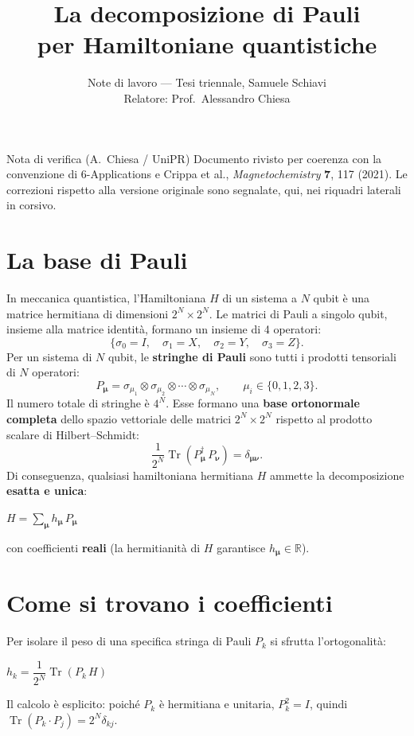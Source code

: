 \documentclass[11pt,a4paper]{article}
\title{\vspace{-1.5em}\color{inkblue}La decomposizione di Pauli\\[0.1em]per Hamiltoniane quantistiche}
\author{Note di lavoro --- Tesi triennale, Samuele Schiavi\\ Relatore: Prof.\ Alessandro Chiesa}
\date{}
\begin{document}
\sloppy
\maketitle
\thispagestyle{fancy}
\vspace{-2em}

\begin{advisorbox}{Nota di verifica (A.\ Chiesa / UniPR)}
Documento rivisto per coerenza con la convenzione di 6-Applications e
Crippa et al., \emph{Magnetochemistry} \textbf{7}, 117 (2021). Le
correzioni rispetto alla versione originale sono segnalate, qui, nei
riquadri laterali in corsivo.
\end{advisorbox}

\section{La base di Pauli}

In meccanica quantistica, l'Hamiltoniana $H$ di un sistema a $N$ qubit è
una matrice hermitiana di dimensioni $2^N\times2^N$. Le matrici di Pauli
a singolo qubit, insieme alla matrice identità, formano un insieme di 4
operatori:
$$\{\sigma_0=I,\quad\sigma_1=X,\quad\sigma_2=Y,\quad\sigma_3=Z\}.$$
Per un sistema di $N$ qubit, le \textbf{stringhe di Pauli} sono tutti i
prodotti tensoriali di $N$ operatori:
$$P_{\boldsymbol\mu}=\sigma_{\mu_1}\otimes\sigma_{\mu_2}\otimes\cdots\otimes\sigma_{\mu_N},
\qquad \mu_i\in\{0,1,2,3\}.$$
Il numero totale di stringhe è $4^N$. Esse formano una \textbf{base
ortonormale completa} dello spazio vettoriale delle matrici
$2^N\times2^N$ rispetto al prodotto scalare di Hilbert--Schmidt:
$$\frac{1}{2^N}\operatorname{Tr}(P_{\boldsymbol\mu}^\dagger\,P_{\boldsymbol\nu})=\delta_{\boldsymbol\mu\boldsymbol\nu}.$$
Di conseguenza, qualsiasi hamiltoniana hermitiana $H$ ammette la
decomposizione \textbf{esatta e unica}:
\begin{keyeq}
\centering
$H = \displaystyle\sum_{\boldsymbol\mu} h_{\boldsymbol\mu}\, P_{\boldsymbol\mu}$
\end{keyeq}
con coefficienti \textbf{reali} (la hermitianità di $H$ garantisce
$h_{\boldsymbol\mu}\in\mathbb R$).

\section{Come si trovano i coefficienti}

Per isolare il peso di una specifica stringa di Pauli $P_k$ si sfrutta
l'ortogonalità:
\begin{keyeq}
\centering
$h_k = \dfrac{1}{2^N}\operatorname{Tr}(P_k\,H)$
\end{keyeq}
Il calcolo è esplicito: poiché $P_k$ è hermitiana e unitaria, $P_k^2=I$,
quindi $\operatorname{Tr}(P_k\cdot P_j)=2^N\delta_{kj}$.
\end{document}
